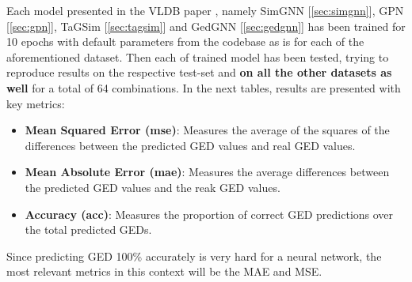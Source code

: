 \documentclass[../Thesis.tex]{subfiles}
\begin{document}
	Each model presented in the VLDB paper \cite{computing_graph_edit_distance_via_neural_graph_matching}, namely SimGNN [\autoref{sec:simgnn}], GPN [\autoref{sec:gpn}], TaGSim [\autoref{sec:tagsim}] and GedGNN [\autoref{sec:gedgnn}] has been trained for 10 epochs with default parameters from the codebase as is for each of the aforementioned dataset. Then each of trained model has been tested, trying to reproduce \cite{computing_graph_edit_distance_via_neural_graph_matching} results on the respective test-set and \textbf{on all the other datasets as well} for a total of 64 combinations. In the next tables, results are presented with key metrics: 
	\begin{itemize}
		\item \textbf{Mean Squared Error (mse)}: Measures the average of the squares of the differences between the predicted GED values and real GED values.
		\item \textbf{Mean Absolute Error (mae)}: Measures the average differences between the predicted GED values and the reak GED values.
		\item \textbf{Accuracy (acc)}: Measures the proportion of correct GED predictions over the total predicted GEDs.
	\end{itemize}
	
	Since predicting GED 100\% accurately is very hard for a neural network, the most relevant metrics in this context will be the MAE and MSE.
	
\end{document}
